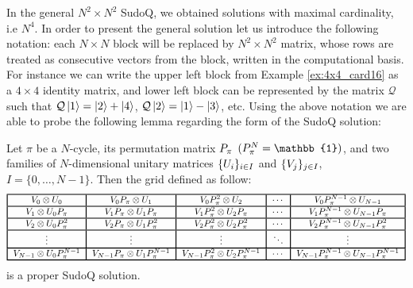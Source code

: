 \documentclass[11pt]{article}
\begin{document}
In the general $N^{2} \times N^{2}$ SudoQ, we obtained solutions with maximal cardinality, i.e $N^{4}$. In order to present the general solution let us introduce the following notation: each $N \times N$ block will be replaced by $N^{2} \times N^{2}$ matrix, whose rows are treated as consecutive vectors from the block, written in the computational basis. 
For instance we can write the upper left block from Example \ref{ex:4x4_card16} as a $4\times 4$ identity matrix, and lower left block can be represented by the matrix $\mathcal{Q}$ such that $\mathcal{Q}\ket{1}=\ket{2}+\ket{4}$, $\mathcal{Q}\ket{2}=\ket{1}-\ket{3}$, etc.
Using the above notation we are able to probe the following lemma regarding the form of the SudoQ solution:
 \begin{lemma}\label{biglemma}
    Let $\pi$ be a $N$-cycle, its permutation matrix $\mathnormal{P}_\pi$ $(\mathnormal{P}_\pi^N=\mathbb{1})$, and two families of $N$-dimensional unitary matrices $\{\mathnormal{U}_i\}_{i\in I}$ and $\{\mathnormal{V}_j\}_{j\in I}$, $I=\{0,\ldots,N-1\}$. Then the grid defined as follow:
    \[
    \begin{tabular}{!{\vrule width 1pt}c!{\vrule width 1pt}c!{\vrule width 1pt}c!{\vrule width 1pt}c!{\vrule width 1pt}c!{\vrule width 1pt}}
    \noalign{\hrule height 1pt}
    $\mathnormal{V}_0\otimes\mathnormal{U}_0$ & $\mathnormal{V}_0\mathnormal{P}_\pi\otimes\mathnormal{U}_1$ & $\mathnormal{V}_0\mathnormal{P}_\pi^2\otimes\mathnormal{U}_2$ & $\cdots$ & $\mathnormal{V}_0\mathnormal{P}_\pi^{N-1}\otimes\mathnormal{U}_{N-1}$ \tabularnewline
    \noalign{\hrule height 1pt}
    $\mathnormal{V}_1\otimes\mathnormal{U}_0\mathnormal{P}_\pi$ & $\mathnormal{V}_1\mathnormal{P}_\pi\otimes\mathnormal{U}_1\mathnormal{P}_\pi$ & $\mathnormal{V}_1\mathnormal{P}_\pi^2\otimes\mathnormal{U}_2\mathnormal{P}_\pi$ & $\cdots$ & $\mathnormal{V}_1\mathnormal{P}_\pi^{N-1}\otimes\mathnormal{U}_{N-1}\mathnormal{P}_\pi$ \tabularnewline
    \noalign{\hrule height 1pt}
    $\mathnormal{V}_2\otimes\mathnormal{U}_0\mathnormal{P}_\pi^2$ & $\mathnormal{V}_2\mathnormal{P}_\pi\otimes\mathnormal{U}_1\mathnormal{P}_\pi^2$ & $\mathnormal{V}_2\mathnormal{P}_\pi^2\otimes\mathnormal{U}_2\mathnormal{P}_\pi^2$ & $\cdots$ & $\mathnormal{V}_2\mathnormal{P}_\pi^{N-1}\otimes\mathnormal{U}_{N-1}\mathnormal{P}_\pi^2$ \tabularnewline
    \noalign{\hrule height 1pt}
    $\vdots$ & $\vdots$ & $\vdots$ & $\ddots$ & $\vdots$ \tabularnewline
    \noalign{\hrule height 1pt}
    $\mathnormal{V}_{N-1}\otimes\mathnormal{U}_0\mathnormal{P}_\pi^{N-1}$ & $\mathnormal{V}_{N-1}\mathnormal{P}_\pi\otimes\mathnormal{U}_1\mathnormal{P}_\pi^{N-1}$ & $\mathnormal{V}_{N-1}\mathnormal{P}_\pi^2\otimes\mathnormal{U}_2\mathnormal{P}_\pi^{N-1}$ & $\cdots$ & $\mathnormal{V}_{N-1}\mathnormal{P}_\pi^{N-1}\otimes\mathnormal{U}_{N-1}\mathnormal{P}_\pi^{N-1}$ \tabularnewline
    \noalign{\hrule height 1pt}
    \end{tabular}
    \]
    is a proper SudoQ solution.
    \end{lemma}
    
\end{document}
